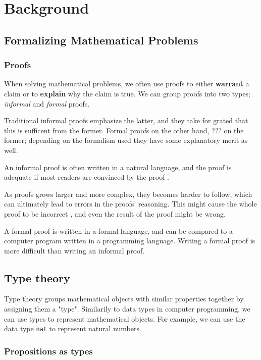 \chapter{Background}


\section{Formalizing Mathematical Problems}

\subsection{Proofs}

When solving mathematical problems, we often use proofs
to either \textbf{warrant} a claim or to \textbf{explain} why the claim is true.
We can group proofs into two types; \textit{informal} and \textit{formal} proofs.

Traditional informal proofs emphasize the latter, and they take for grated that this is sufficent from the former.
Formal proofs on the other hand, ??? on the former; depending on the formalism used they have some
explanatory merit as well.

An informal proof is often written in a natural language, and the proof is adequate if most
readers are convinced by the proof \cite{bpierce}.

As proofs grows larger and more complex, they becomes harder to follow, which can
ultimately lead to errors in the proofs' reasoning. This might cause the whole proof
to be incorrect \cite{rkhamsi}, and even the result of the proof might be wrong.

A formal proof is written in a formal language, and can be compared to a computer program
written in a programming language. Writing a formal proof is more difficult than writing an informal proof.

\section{Type theory}

Type theory groups mathematical objects with similar properties together by assigning them a "type".
Similarily to data types in computer programming, we can use types to represent mathematical
objects. For example, we can use the data type \texttt{nat} to represent natural numbers.

\subsection{Propositions as types}

